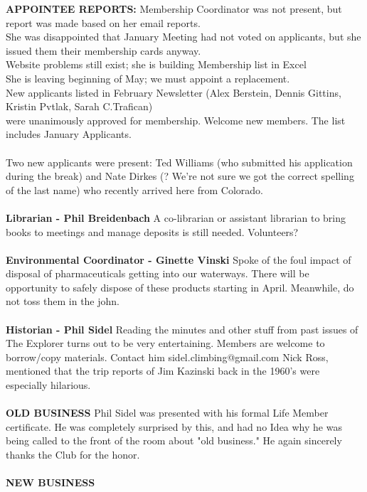 \documentclass[10pt,a4paper]{article}
\begin{document}
\textbf{APPOINTEE REPORTS:}
Membership Coordinator was not present, but report was made based on her email reports. \\
She was disappointed that January Meeting had not voted on applicants, but she issued them their membership cards anyway.\\
Website problems still exist; she is building Membership list in Excel \\
She is leaving beginning of May; we must appoint a replacement. \\
New applicants listed in February Newsletter (Alex Berstein, Dennis Gittins, Kristin Pvtlak, Sarah C.Trafican) \\
were unanimously approved for membership.  Welcome new members. The list includes January Applicants.
\\
\\
Two new applicants were present: Ted Williams (who submitted his application during the break) 
and Nate Dirkes (? We're not sure we got the correct spelling of the last name) who recently arrived here from Colorado.
\\
\\
\textbf{Librarian - Phil Breidenbach }
A co-librarian or assistant librarian to bring books to meetings and manage deposits is still needed.  Volunteers?
\\
\\
\textbf{Environmental Coordinator - Ginette Vinski} 
Spoke of the foul impact of disposal of pharmaceuticals  getting into our waterways.  There will be opportunity to safely dispose of these products starting in April.  Meanwhile, do not toss them in the john.
\\
\\
\textbf{Historian - Phil Sidel}
Reading the minutes and other stuff from past issues of The Explorer turns out to be very entertaining.  Members are welcome to borrow/copy materials.  Contact him sidel.climbing@gmail.com
Nick Ross, mentioned that the trip reports of Jim Kazinski back in the 1960's were especially hilarious.\\
\\
\textbf{OLD BUSINESS}
Phil Sidel was presented with his formal Life Member certificate.  He was completely surprised by this, and had no Idea why he was being called to the front of the room about "old business."  He again sincerely thanks the Club for the honor.
\\
\\
\textbf{NEW BUSINESS}
\\
\end{document}
